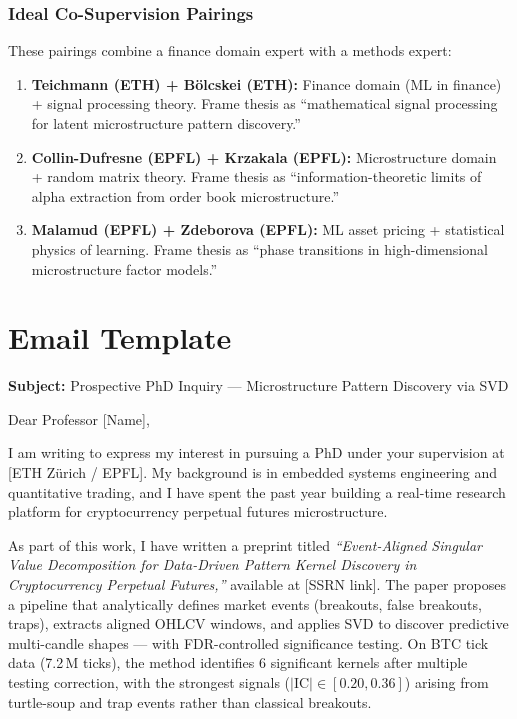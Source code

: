 \documentclass[11pt,a4paper]{article}
\begin{document}
\section{Ideal Co-Supervision Pairings}

These pairings combine a finance domain expert with a methods expert:

\begin{enumerate}
  \item \textbf{Teichmann (ETH) + B\"olcskei (ETH):} Finance domain (ML in finance) + signal processing theory. Frame thesis as ``mathematical signal processing for latent microstructure pattern discovery.''
  \item \textbf{Collin-Dufresne (EPFL) + Krzakala (EPFL):} Microstructure domain + random matrix theory. Frame thesis as ``information-theoretic limits of alpha extraction from order book microstructure.''
  \item \textbf{Malamud (EPFL) + Zdeborova (EPFL):} ML asset pricing + statistical physics of learning. Frame thesis as ``phase transitions in high-dimensional microstructure factor models.''
\end{enumerate}

\newpage

\part{Email Template}

\noindent\textbf{Subject:} Prospective PhD Inquiry --- Microstructure Pattern Discovery via SVD

\bigskip

\noindent Dear Professor [Name],

\medskip

I am writing to express my interest in pursuing a PhD under your supervision at [ETH Z\"urich / EPFL]. My background is in embedded systems engineering and quantitative trading, and I have spent the past year building a real-time research platform for cryptocurrency perpetual futures microstructure.

\medskip

As part of this work, I have written a preprint titled \textit{``Event-Aligned Singular Value Decomposition for Data-Driven Pattern Kernel Discovery in Cryptocurrency Perpetual Futures,''} available at [SSRN link]. The paper proposes a pipeline that analytically defines market events (breakouts, false breakouts, traps), extracts aligned OHLCV windows, and applies SVD to discover predictive multi-candle shapes --- with FDR-controlled significance testing. On BTC tick data (7.2\,M ticks), the method identifies 6 significant kernels after multiple testing correction, with the strongest signals ($|\text{IC}| \in [0.20, 0.36]$) arising from turtle-soup and trap events rather than classical breakouts.
\end{document}
